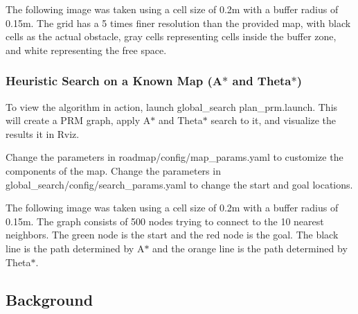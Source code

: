 The following image was taken using a cell size of 0.\+2m with a buffer radius of 0.\+15m. The grid has a 5 times finer resolution than the provided map, with black cells as the actual obstacle, gray cells representing cells inside the buffer zone, and white representing the free space.

 \subsubsection*{Heuristic Search on a Known Map (A$\ast$ and Theta$\ast$)}

To view the algorithm in action, launch {\ttfamily global\+\_\+search plan\+\_\+prm.\+launch}. This will create a P\+RM graph, apply A$\ast$ and Theta$\ast$ search to it, and visualize the results it in Rviz.

Change the parameters in {\ttfamily roadmap/config/map\+\_\+params.\+yaml} to customize the components of the map. Change the parameters in {\ttfamily global\+\_\+search/config/search\+\_\+params.\+yaml} to change the start and goal locations.

The following image was taken using a cell size of 0.\+2m with a buffer radius of 0.\+15m. The graph consists of 500 nodes trying to connect to the 10 nearest neighbors. The green node is the start and the red node is the goal. The black line is the path determined by A$\ast$ and the orange line is the path determined by Theta$\ast$.



\subsection*{Background}